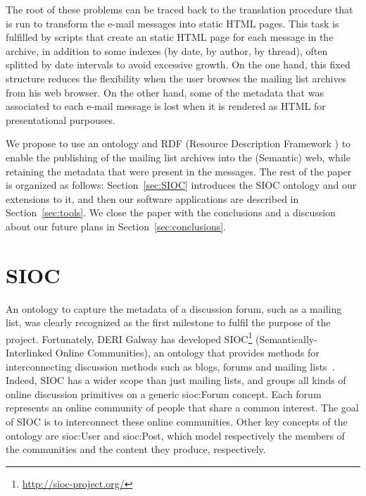 \documentclass{llncs}
\begin{document}
The root of these problems can be traced back to the translation
procedure that is run to transform the e-mail messages into static
HTML pages. This task is fulfilled by scripts that create an
static HTML page for each message in the archive, in addition to
some indexes (by date, by author, by thread), often splitted by
date intervals to avoid excessive growth. On the one hand, this 
fixed structure reduces the flexibility when the user browses the
mailing list archives from his web browser. On the other hand, some 
of the metadata that was associated to each e-mail message is lost
when it is rendered as HTML for presentational purpouses.

We propose to use an ontology and RDF (Resource Description Framework
\cite{RDF}) to enable the publishing of the mailing list archives into 
the (Semantic) web, while retaining the metadata that were present in 
the messages. The rest of the paper is organized as follows: 
Section~\ref{sec:SIOC} introduces the SIOC ontology and our extensions 
to it, and then our software applications are described in 
Section~\ref{sec:tools}. We close the paper with the conclusions and 
a discussion about our future plans in Section~\ref{sec:conclusions}.

\section{\label{sec:SIOC}SIOC}

An ontology to capture the metadata of a discussion forum, such as
a mailing list, was clearly recognized as the first milestone to
fulfil the purpose of the project. Fortunately, DERI Galway has 
developed SIOC\footnote{\url{http://sioc-project.org/}} (Semantically-Interlinked 
Online Communities), an ontology that provides methods for interconnecting 
discussion methods such as blogs, forums and mailing 
lists~\cite{Breslin2006}\cite{Breslin2005}. Indeed, SIOC has a wider 
scope than just mailing lists, and groups all kinds of online discussion 
primitives on a generic \textsf{sioc:Forum} concept. Each forum represents 
an online community of people that share a common interest. The goal 
of SIOC is to interconnect these online communities. Other key concepts 
of the ontology are \textsf{sioc:User} and \textsf{sioc:Post}, which 
model respectively the members of the communities and the content they 
produce, respectively.

\end{document}
